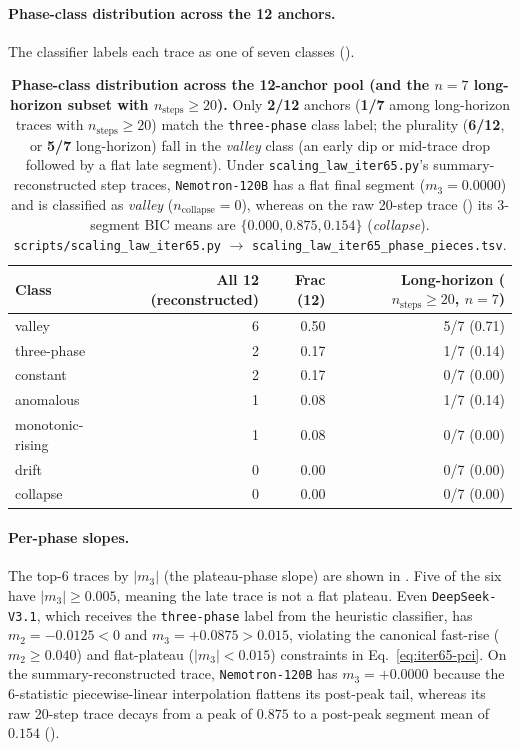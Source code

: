 \paragraph{Phase-class distribution across the 12 anchors.}
The classifier labels each trace as one of seven classes
().

\begin{table}[t]
  \centering
  \small
  \begin{tabular}{lrrr}
    \toprule
    Class & All 12 (reconstructed) & Frac (12) & Long-horizon ($n_{\text{steps}} \ge 20$, $n=7$) \\
    \midrule
    valley & 6 & 0.50 & 5/7 (0.71) \\
    three-phase & 2 & 0.17 & 1/7 (0.14) \\
    constant & 2 & 0.17 & 0/7 (0.00) \\
    anomalous & 1 & 0.08 & 1/7 (0.14) \\
    monotonic-rising & 1 & 0.08 & 0/7 (0.00) \\
    drift & 0 & 0.00 & 0/7 (0.00) \\
    collapse & 0 & 0.00 & 0/7 (0.00) \\
    \bottomrule
  \end{tabular}
  \caption{\textbf{Phase-class distribution across the 12-anchor
    pool (and the $n=7$ long-horizon subset with $n_{\text{steps}} \ge 20$).}  Only \textbf{2/12}
    anchors (\textbf{1/7} among long-horizon traces with $n_{\text{steps}} \ge 20$) match the \texttt{three-phase} class label; the plurality
    (\textbf{6/12}, or \textbf{5/7} long-horizon) fall in the \emph{valley} class (an early dip or mid-trace drop followed by a flat late segment).  Under \texttt{scaling\_law\_iter65.py}'s summary-reconstructed step traces, \texttt{Nemotron-120B} has a flat final segment ($m_3 = 0.0000$) and is classified as \emph{valley} ($n_{\text{collapse}}=0$), whereas on the raw 20-step trace () its 3-segment BIC means are $\{0.000, 0.875, 0.154\}$ (\emph{collapse}).
    \texttt{scripts/scaling\_law\_iter65.py}
    $\to$ \texttt{scaling\_law\_iter65\_phase\_pieces.tsv}.}
  \label{tab:iter65-class-dist}
\end{table}

\paragraph{Per-phase slopes.}
The top-6 traces by $|m_3|$ (the plateau-phase slope) are
shown in .  Five of the six
have $|m_3| \geq 0.005$, meaning the late trace is not a flat
plateau.  Even \texttt{DeepSeek-V3.1}, which receives the \texttt{three-phase} label from the heuristic classifier, has $m_2 = -0.0125 < 0$ and $m_3 = +0.0875 > 0.015$, violating the canonical fast-rise ($m_2 \ge 0.040$) and flat-plateau ($|m_3| < 0.015$) constraints in Eq.~\eqref{eq:iter65-pci}.  On the summary-reconstructed trace, \texttt{Nemotron-120B} has
$m_3 = +0.0000$ because the 6-statistic piecewise-linear interpolation flattens its post-peak tail, whereas its raw 20-step trace decays from a peak of $0.875$ to a post-peak segment mean of $0.154$ ().

